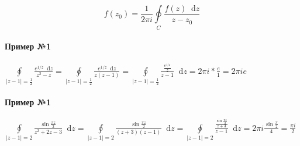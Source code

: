 \documentclass{article}
\newcommand*\diff{\mathop{}\!\mathrm{d}}
\begin{document}
$$
f(z_0) = \frac{1}{2 \pi i} \oint\limits_{C} \frac{f(z) \diff z}{z - z_0} 
$$

\paragraph{Пример №1}

$\oint\limits_{|z - 1| = \frac{1}{2}} \frac{e^{1/z} \diff z}{z^2 - z} = \oint\limits_{|z - 1| = \frac{1}{2}} \frac{e^{1/z} \diff z}{z (z - 1)} = \oint\limits_{|z - 1| = \frac{1}{2}} \frac{\frac{e^{1/z}}{z}}{z - 1} \diff z = 2 \pi i * \frac{e}{1} = 2 \pi i e$

\paragraph{Пример №1}

$\oint\limits_{|z - 1| = 2} \frac{\sin \frac{\pi z}{2}}{z^2 + 2 z - 3} \diff z = \oint\limits_{|z - 1| = 2} \frac{\sin \frac{\pi z}{2}}{(z + 3)(z - 1)} \diff z = \oint\limits_{|z - 1| = 2} \frac{\frac{\sin \frac{\pi z}{2}}{z + 3}}{z - 1} \diff z = 2 \pi i \frac{\sin \frac{\pi}{2}}{4} = \frac{\pi i}{2}$
\end{document}
